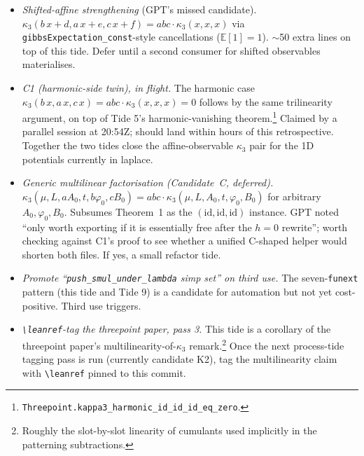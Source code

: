 \documentclass[11pt]{article}
\begin{document}
\begin{itemize}
\item \emph{Shifted-affine strengthening} (GPT's missed candidate).
  $\kappa_3(b\,x + d, a\,x + e, c\,x + f) = abc \cdot \kappa_3(x, x, x)$
  via \texttt{gibbsExpectation\_const}-style cancellations
  ($\mathbb{E}[1] = 1$). $\sim$50 extra lines on top of this tide.
  Defer until a second consumer for shifted observables materialises.

\item \emph{C1 (harmonic-side twin), in flight.} The harmonic case
  $\kappa_3(b\,x, a\,x, c\,x) = abc \cdot \kappa_3(x, x, x) = 0$
  follows by the same trilinearity argument, on top of Tide 5's
  harmonic-vanishing theorem.\footnote{\texttt{Threepoint.kappa3\_harmonic\_id\_id\_id\_eq\_zero}.}
  Claimed by a parallel session at 20:54Z; should land within hours
  of this retrospective. Together the two tides close the
  affine-observable $\kappa_3$ pair for the 1D potentials currently
  in laplace.

\item \emph{Generic multilinear factorisation (Candidate~C, deferred).}
  $\kappa_3(\mu, L, a A_0, t, b \varphi_0, c B_0) = abc \cdot \kappa_3(\mu, L, A_0, t, \varphi_0, B_0)$
  for arbitrary $A_0, \varphi_0, B_0$. Subsumes Theorem~1 as the
  $(\mathrm{id}, \mathrm{id}, \mathrm{id})$ instance. GPT noted ``only
  worth exporting if it is essentially free after the $h=0$ rewrite'';
  worth checking against C1's proof to see whether a unified C-shaped
  helper would shorten both files. If yes, a small refactor tide.

\item \emph{Promote ``\texttt{push\_smul\_under\_lambda} simp set''
  on third use.} The seven-\texttt{funext} pattern (this tide and
  Tide 9) is a candidate for automation but not yet cost-positive.
  Third use triggers.

\item \emph{\texttt{\textbackslash leanref}-tag the threepoint paper, pass 3.}
  This tide is a corollary of the threepoint paper's multilinearity-of-$\kappa_3$
  remark.\footnote{Roughly the slot-by-slot linearity of cumulants
  used implicitly in the patterning subtractions.} Once the next
  process-tide tagging pass is run (currently candidate K2), tag the
  multilinearity claim with \texttt{\textbackslash leanref} pinned to
  this commit.
\end{itemize}
\end{document}
